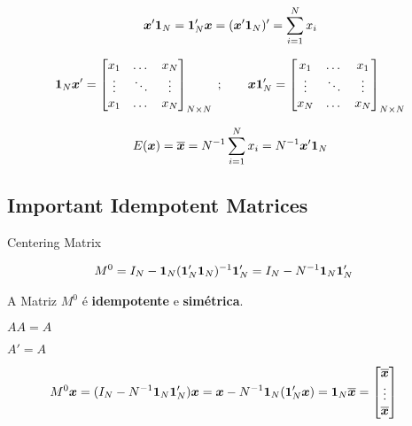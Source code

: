 \documentclass[11pt,oneside,a4paper]{article}
\numberwithin{equation}{section}
\begin{document}
\begin{align*}
\boldsymbol{x}' \boldsymbol{1}_{N} = 
\boldsymbol{1}_{N}' \boldsymbol{x} = 
(\boldsymbol{x}' \boldsymbol{1}_{N})' = 
\sum_{i=1}^{N} x_{i}
\end{align*}

\begin{align*}
\boldsymbol{1}_{N} \boldsymbol{x}' =
\begin{bmatrix}
	x_{1} & \dots & x_{N} \\
	\vdots & \ddots & \vdots \\
	x_{1} & \dots & x_{N}	
\end{bmatrix}_{N \times N}
\; ; \qquad
\boldsymbol{x} \boldsymbol{1}_{N}' =
\begin{bmatrix}
	x_{1} & \dots & x_{1} \\
	\vdots & \ddots & \vdots \\
	x_{N} & \dots & x_{N}	
\end{bmatrix}_{N \times N}
\end{align*}

\begin{align*}
E( \boldsymbol{x} ) = \overline{\boldsymbol{x}} = N^{-1} \sum_{i=1}^{N} x_{i} = N^{-1} \boldsymbol{x}'\boldsymbol{1}_{N}
\end{align*}

\subsection*{Important Idempotent Matrices}
\noindent
\cite[p. 978, A.28]{greene-7ed}

Centering Matrix

\vspace{-1 em}
\begin{align*}
	M^{0} &= 
	I_{N} - \boldsymbol{1}_{N} ( \boldsymbol{1}_{N}' \boldsymbol{1}_{N} )^{-1} \boldsymbol{1}_{N}'
	= 
	I_{N} - N^{-1} \boldsymbol{1}_{N} \boldsymbol{1}_{N}' 
\end{align*}

A Matriz $M^{0}$ é \textbf{idempotente} e \textbf{simétrica}.

\begin{description}\itemsep0pt
\item [Idempotência:] $AA = A$
\item [Simetria:] $A'=A$
\end{description}


\vspace{-1 em}
\begin{align*}
M^{0} \boldsymbol{x} &= 
( I_{N} - N^{-1} \boldsymbol{1}_{N} \boldsymbol{1}_{N}' ) \boldsymbol{x} 
= 
\boldsymbol{x} - N^{-1} \boldsymbol{1}_{N} (\boldsymbol{1}_{N}' \boldsymbol{x}) 
=
\boldsymbol{1}_{N} \overline{\boldsymbol{x}}
=
\begin{bmatrix}
\overline{\boldsymbol{x}} \\ \vdots \\ \overline{\boldsymbol{x}}
\end{bmatrix}
\end{align*}
\end{document}
